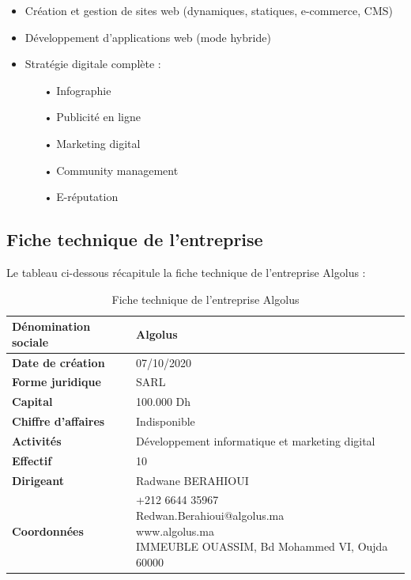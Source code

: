 \documentclass[12pt,a4paper]{report}
\begin{document}
	\begin{itemize}
		\item Création et gestion de sites web (dynamiques, statiques, e-commerce, CMS)
		\item Développement d'applications web (mode hybride)
		\item Stratégie digitale complète :
		\begin{itemize}
			\item[•] Infographie			
			\item[•] Publicité en ligne			
			\item[•] Marketing digital			
			\item[•] Community management			
			\item[•] E-réputation			
		\end{itemize}
	\end{itemize}
	
	\subsection{Fiche technique de l'entreprise}
	
	Le tableau ci-dessous récapitule la fiche technique de l'entreprise Algolus :
	
	\begin{table}[htbp]
		\centering
		\caption{Fiche technique de l'entreprise Algolus}  %
		\begin{tabular}{|l|l|}
			\hline
			\textbf{Dénomination sociale} & Algolus \\
			\hline
			\textbf{Date de création} & 07/10/2020 \\
			\hline
			\textbf{Forme juridique} & SARL \\
			\hline
			\textbf{Capital} & 100.000 Dh \\
			\hline
			\textbf{Chiffre d'affaires} & Indisponible \\
			\hline
			\textbf{Activités} & Développement informatique et marketing digital \\
			\hline
			\textbf{Effectif} & 10 \\
			\hline
			\textbf{Dirigeant} & Radwane BERAHIOUI \\
			\hline
			\textbf{Coordonnées} & \makecell[l]{+212 6644 35967 \\ Redwan.Berahioui@algolus.ma \\ www.algolus.ma \\ IMMEUBLE OUASSIM, Bd Mohammed VI, Oujda 60000} \\
			\hline
		\end{tabular}
		\label{tab:fiche-technique-algolus}  %
	\end{table}
	
\end{document}
